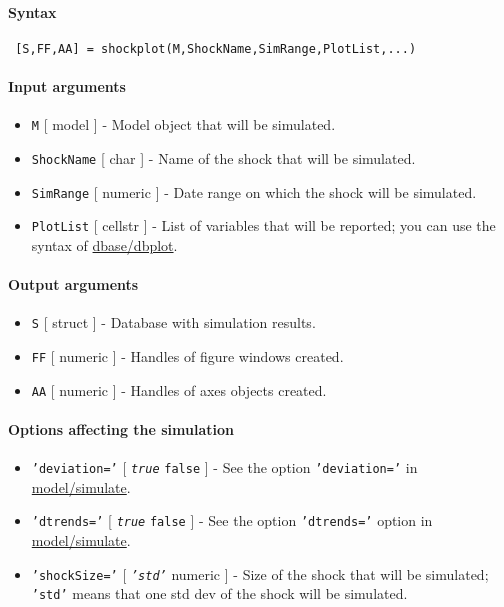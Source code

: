 


	\paragraph{Syntax}
 
 \begin{verbatim}
 [S,FF,AA] = shockplot(M,ShockName,SimRange,PlotList,...)
 \end{verbatim}
 
 \paragraph{Input arguments}
 
 \begin{itemize}
 \item
   \texttt{M} {[} model {]} - Model object that will be simulated.
 \item
   \texttt{ShockName} {[} char {]} - Name of the shock that will be
   simulated.
 \item
   \texttt{SimRange} {[} numeric {]} - Date range on which the shock will
   be simulated.
 \item
   \texttt{PlotList} {[} cellstr {]} - List of variables that will be
   reported; you can use the syntax of \url{dbase/dbplot}.
 \end{itemize}
 
 \paragraph{Output arguments}
 
 \begin{itemize}
 \item
   \texttt{S} {[} struct {]} - Database with simulation results.
 \item
   \texttt{FF} {[} numeric {]} - Handles of figure windows created.
 \item
   \texttt{AA} {[} numeric {]} - Handles of axes objects created.
 \end{itemize}
 
 \paragraph{Options affecting the simulation}
 
 \begin{itemize}
 \item
   \texttt{'deviation='} {[} \emph{\texttt{true}} \textbar{}
   \texttt{false} {]} - See the option \texttt{'deviation='} in
   \url{model/simulate}.
 \item
   \texttt{'dtrends='} {[} \emph{\texttt{true}} \textbar{} \texttt{false}
   {]} - See the option \texttt{'dtrends='} option in
   \url{model/simulate}.
 \item
   \texttt{'shockSize='} {[} \emph{\texttt{'std'}} \textbar{} numeric {]}
   - Size of the shock that will be simulated; \texttt{'std'} means that
   one std dev of the shock will be simulated.
 \end{itemize}
 
